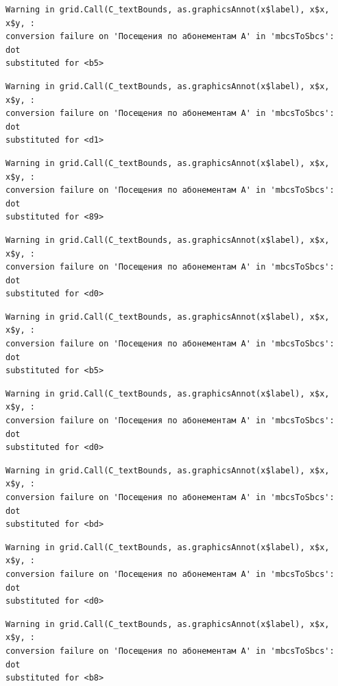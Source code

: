 \documentclass[
  letterpaper,
  DIV=11,
  numbers=noendperiod]{scrartcl}
\begin{document}
\begin{verbatim}
Warning in grid.Call(C_textBounds, as.graphicsAnnot(x$label), x$x, x$y, :
conversion failure on 'Посещения по абонементам А' in 'mbcsToSbcs': dot
substituted for <b5>
\end{verbatim}

\begin{verbatim}
Warning in grid.Call(C_textBounds, as.graphicsAnnot(x$label), x$x, x$y, :
conversion failure on 'Посещения по абонементам А' in 'mbcsToSbcs': dot
substituted for <d1>
\end{verbatim}

\begin{verbatim}
Warning in grid.Call(C_textBounds, as.graphicsAnnot(x$label), x$x, x$y, :
conversion failure on 'Посещения по абонементам А' in 'mbcsToSbcs': dot
substituted for <89>
\end{verbatim}

\begin{verbatim}
Warning in grid.Call(C_textBounds, as.graphicsAnnot(x$label), x$x, x$y, :
conversion failure on 'Посещения по абонементам А' in 'mbcsToSbcs': dot
substituted for <d0>
\end{verbatim}

\begin{verbatim}
Warning in grid.Call(C_textBounds, as.graphicsAnnot(x$label), x$x, x$y, :
conversion failure on 'Посещения по абонементам А' in 'mbcsToSbcs': dot
substituted for <b5>
\end{verbatim}

\begin{verbatim}
Warning in grid.Call(C_textBounds, as.graphicsAnnot(x$label), x$x, x$y, :
conversion failure on 'Посещения по абонементам А' in 'mbcsToSbcs': dot
substituted for <d0>
\end{verbatim}

\begin{verbatim}
Warning in grid.Call(C_textBounds, as.graphicsAnnot(x$label), x$x, x$y, :
conversion failure on 'Посещения по абонементам А' in 'mbcsToSbcs': dot
substituted for <bd>
\end{verbatim}

\begin{verbatim}
Warning in grid.Call(C_textBounds, as.graphicsAnnot(x$label), x$x, x$y, :
conversion failure on 'Посещения по абонементам А' in 'mbcsToSbcs': dot
substituted for <d0>
\end{verbatim}

\begin{verbatim}
Warning in grid.Call(C_textBounds, as.graphicsAnnot(x$label), x$x, x$y, :
conversion failure on 'Посещения по абонементам А' in 'mbcsToSbcs': dot
substituted for <b8>
\end{verbatim}
\end{document}
